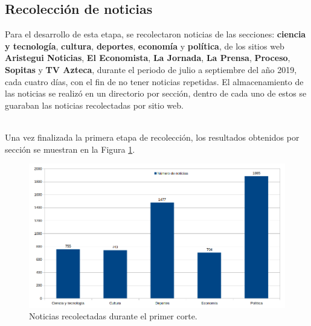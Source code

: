 \begin{table}[H]
\centering
{}
\caption{Ejemplo de estructura de un archivo CSV}
\label{tab:csv}
\end{table}

\subsection{Recolección de noticias}

Para el desarrollo de esta etapa, se recolectaron noticias de las secciones: \textbf{ciencia y tecnología}, \textbf{cultura}, \textbf{deportes}, \textbf{economía} y \textbf{política}, de los sitios web \textbf{Aristegui Noticias}, \textbf{El Economista}, \textbf{La Jornada}, \textbf{La Prensa}, \textbf{Proceso}, \textbf{Sopitas} y \textbf{TV Azteca}, durante el periodo de julio a septiembre del año 2019, cada cuatro días, con el fin de no tener noticias repetidas. El almacenamiento de las noticias se realizó en un directorio por sección, dentro de cada uno de estos se guaraban las noticias recolectadas por sitio web.

\\

Una vez finalizada la primera etapa de recolección, los resultados obtenidos por sección se muestran en la Figura  \ref{Fig:notseccionV1}.
\begin{figure}[H]
	\centering
	\includegraphics[scale=.35]{imagenes/Capitulo5/noticiasPorSeccionV1.png}
	\caption{Noticias recolectadas durante el primer corte.}
	\label{Fig:notseccionV1}
\end{figure}

